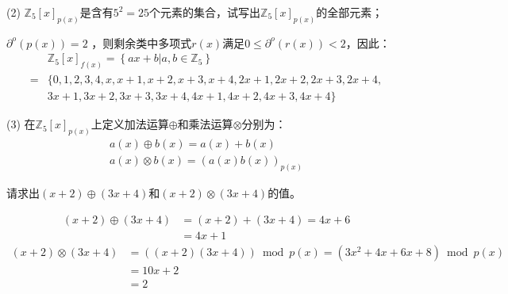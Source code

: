 (2) $\mathbb{Z}_5[x]_{p(x)}$是含有$5^2=25$个元素的集合，试写出$\mathbb{Z}_5[x]_{p(x)}$的全部元素；

\begin{Solution}
    $\partial^o(p(x))=2$
    ，则剩余类中多项式$r(x)$满足$0\le \partial^o(r(x)) < 2$，因此：
    \begin{equation}
        \begin{aligned}
            &\mathbb{Z}_5[x]_{f(x)} = \left\{ax+b|a,b \in \mathbb{Z}_5\right\}\\
            =&\{0,1,2,3,4,
                        x,x+1,x+2,x+3,x+4,
                        2x+1,2x+2,2x+3,2x+4,\\
                        &3x+1,3x+2,3x+3,3x+4,
                        4x+1,4x+2,4x+3,4x+4\}
        \end{aligned}
    \end{equation}
\end{Solution}

(3) 在$\mathbb{Z}_5[x]_{p(x)}$上定义加法运算$\oplus$和乘法运算$\otimes$分别为：
\begin{equation}
    \begin{aligned}
        a(x) \oplus b(x) = a(x) + b(x)\\
        a(x) \otimes b(x) = (a(x)b(x))_{p(x)}
    \end{aligned}
\end{equation}

请求出$(x+2)\oplus(3x+4)$和$(x+2)\otimes(3x+4)$的值。

\begin{Solution}
    \begin{equation}
        \begin{aligned}
            (x+2)\oplus(3x+4)   &= (x+2) + (3x+4)
                                = 4x + 6\\
                                &= 4x + 1
        \end{aligned}
    \end{equation}
    \begin{equation}
        \begin{aligned}
            (x+2)\otimes(3x+4)  &= ((x+2)(3x+4)) \bmod p(x) = (3x^2 + 4x + 6x + 8) \bmod p(x)\\
                                &= 10x + 2 \\
                                &= 2
        \end{aligned}
    \end{equation}
\end{Solution}


